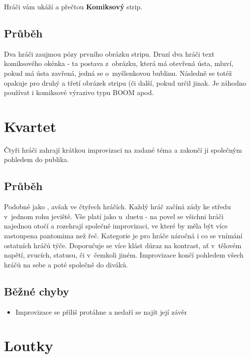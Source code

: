 Hráči vám ukáží a přečtou \textbf{Komiksový} strip. 
 
\subsection{Průběh} Dva hráči zaujmou pózy prvního obrázku stripu. 
Druzí dva hráči   text komiksového okénka - ta postava z~obrázku, která má otevřená ústa, mluví, pokud má ústa zavřená, jedná se o~myšlenkovou bublinu. 
Následně se totéž opakuje pro druhý a třetí obrázek stripu (či další, pokud  určil jinak. 
Je záhodno používat i komiksové výrazivo typu BOOM apod. 
 
 
 
 
\needspace{5cm} \section{Kvartet} \label{kvartet}  
 
 
Čtyři hráči zahrají krátkou improvizaci na zadané téma a zakončí ji společným pohledem do publika. 
 
 
\subsection{Průběh}  
Podobné jako , avšak ve čtyřech hráčích. Každý hráč začíná zády ke středu v~jednom rohu jeviště. Vše platí jako u~duetu - na povel  se všichni hráči najednou otočí a rozehrají společně improvizaci, ve které by měla být více zastoupena pantomima než řeč. Kategorie je pro hráče náročná i co se vnímání ostatních hráčů týče. Doporučuje se více klást důraz na kontrast, ať v~tělovém napětí, zvucích, statusu, či v~čemkoli jiném. Improvizace končí pohledem všech hráčů na sebe a poté společně do diváků. 
 
\subsection{ Běžné chyby } \begin{itemize}
\item Improvizace se příliš protáhne a nedaří se najít její závěr
\end{itemize}
 
 
 
\needspace{5cm} \section{Loutky} \label{loutky}  
 
